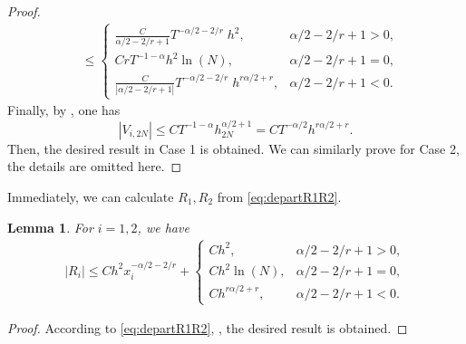 \documentclass{amsart}
\newtheorem{lemma}[theorem]{Lemma}
\theoremstyle{definition}
\theoremstyle{remark}
\numberwithin{equation}{section}
\begin{document}
\begin{proof}
\begin{equation*}
\begin{aligned}
       & \le \begin{cases}
             \frac{C}{\alpha/2-2/r+1}T^{-\alpha/2-2/r} \; h^2,                & \alpha/2-2/r+1 > 0 ,\\
             CrT^{-1-\alpha} h^2 \ln(N),    & \alpha/2-2/r+1 = 0 ,\\
             \frac{C}{|\alpha/2-2/r+1|} T^{-\alpha/2-2/r} \; h^{r\alpha/2+r}, & \alpha/2-2/r+1 < 0  .
           \end{cases}
    \end{aligned}
  \end{equation*}
  Finally, by , one has
  \begin{equation*}
    |V_{i,2N}| \le C T^{-1-\alpha} h_{2N}^{\alpha/2+1} = C T^{-\alpha/2} h^{r\alpha/2+r}.
  \end{equation*}
  Then, the desired result in Case 1 is obtained.
  We can similarly prove for Case 2, the details are omitted here.
\end{proof}



Immediately, we can calculate $R_1, R_2$ from \eqref{eq:departR1R2}.
\begin{lemma} \label{lmm:R1R2}
For \(i=1, 2\), we have
  \begin{equation*}
    \begin{aligned}
      |R_i| \le C h^2 x_i^{-\alpha/2-2/r} +
      \begin{cases}
        C h^2,             & \alpha/2-2/r+1 > 0 ,\\
        C h^2 \ln(N) ,     & \alpha/2-2/r+1 = 0 ,\\
        C h^{r\alpha/2+r}, & \alpha/2-2/r+1 < 0.
      \end{cases}
    \end{aligned}
  \end{equation*}
\end{lemma}
\begin{proof}
  According to \eqref{eq:departR1R2}, , the desired result is obtained.
\end{proof}
\end{document}
